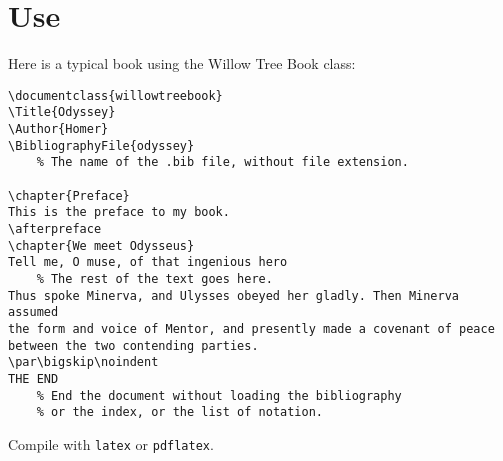 \chapter{Use}
Here is a typical book using the Willow Tree Book class:
\begin{Verbatim}[frame=leftline]
\documentclass{willowtreebook}
\Title{Odyssey}
\Author{Homer}
\BibliographyFile{odyssey}
	% The name of the .bib file, without file extension.

\chapter{Preface}
This is the preface to my book.
\afterpreface
\chapter{We meet Odysseus}
Tell me, O muse, of that ingenious hero
    % The rest of the text goes here.
Thus spoke Minerva, and Ulysses obeyed her gladly. Then Minerva assumed
the form and voice of Mentor, and presently made a covenant of peace
between the two contending parties.
\par\bigskip\noindent
THE END
	% End the document without loading the bibliography
	% or the index, or the list of notation.

\end{Verbatim}
Compile with \verb!latex! or \verb!pdflatex!.
